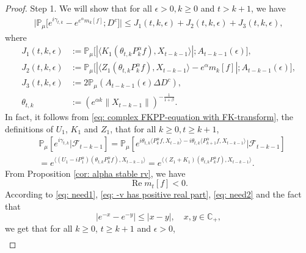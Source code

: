 \documentclass[12pt,a4paper]{amsart}
\theoremstyle{plain}
\theoremstyle{definition}
\numberwithin{equation}{section}
\begin{document}
\begin{proof}
    Step 1. We will show that for all $\epsilon > 0, k\geq 0$ and $t>k+1$, we have
\begin{equation}\begin{split}
    \big|\mathbb{P}_{\mu}\big[e^{i\gamma_{t,k}}-e^{e^{\alpha}m_k[f]}; D^c\big]\big|
    \leq J_1(t,k,\epsilon)+J_2(t,k,\epsilon)+J_3(t,k,\epsilon),
\end{split}\end{equation}
    where
\begin{equation}\begin{split}
\label{eq: Def of Ji}
    J_1(t,k,\epsilon)
    &:= \mathbb{P}_{\mu}\big[|\langle K_1(\theta_{t,k}P^\alpha_k f), X_{t-k-1}\rangle|; A_{t-k-1}(\epsilon) \big],
    \\ J_2(t,k,\epsilon)
    &:= \mathbb{P}_{\mu}\big[|\langle Z_1(\theta_{t,k}P^\alpha_k f),X_{t-k-1}\rangle-e^{\alpha}m_k[f]|; A_{t-k-1}(\epsilon)\big],
    \\ J_3(t,k, \epsilon)
    &:=2\mathbb{P}_{\mu}(A_{t-k-1}(\epsilon)\Delta D^c),
    \\\theta_{t,k}
    &:= (e^{\alpha k}\|X_{t-k-1}\|)^{-\frac{1}{1+\beta}}.
\end{split}\end{equation}
In fact, 
it follows from \eqref{eq: complex FKPP-equation with FK-transform}, the definitions of $U_1$, $K_1$ and $Z_1$, 
that for all
$k\geq 0, t\geq k+1$,
\begin{equation}\begin{split}
\label{eq: need1}
    &\mathbb{P}_{\mu}[e^{i\gamma_{t,k}}|\mathscr{F}_{t-k-1}]
    =\mathbb{P}_{\mu}[e^{i\theta_{t,k}\langle P^\alpha_k f,X_{t-k}\rangle-i\theta_{t,k}\langle P^\alpha_{k+1} f, X_{t-k-1}\rangle}|\mathscr{F}_{t-k-1}]
    \\&=e^{\langle (U_1 - iP^\alpha_1 ) (\theta_{t,k}P^\alpha_k f),X_{t-k-1}\rangle}
    =e^{\langle (Z_1 + K_1) (\theta_{t,k}P^\alpha_k f),X_{t-k-1}\rangle}.
\end{split}\end{equation}
       From Proposition \ref{cor: alpha stable rv}, we have
\begin{equation}
\label{eq: need2}
    \operatorname {Re} m_t[f] < 0.
\end{equation}
    According to \eqref{eq: need1}, \eqref{eq: -v has positive real part}, \eqref{eq: need2} and the fact that
\[
    |e^{-x} - e^{-y}| \leq |x-y|,\quad x,y \in \mathbb C_+,
\]
    we get that for all $k\geq 0$, $t\geq k+1$ and $\epsilon> 0$,
\begin{equation}\begin{split}

\end{split}
\end{equation}
\end{proof}
\end{document}
